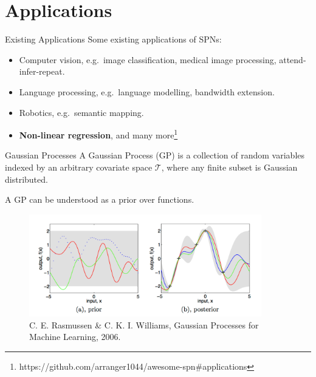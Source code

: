 \section{Applications}

\begin{frame}{Existing Applications}
Some existing applications of SPNs:
\begin{itemize}
    \item Computer vision, e.g.~image classification, medical image processing, attend-infer-repeat.
    \item Language processing, e.g.~language modelling, bandwidth extension.
    \item Robotics, e.g.~semantic mapping.
    \item \textbf{Non-linear regression}, and many more\footnote{\scriptsize https://github.com/arranger1044/awesome-spn\#applications}
\end{itemize}
\end{frame}

\begin{frame}{Gaussian Processes}
    A Gaussian Process (GP) is a collection of random variables indexed by an arbitrary
    covariate space $\mathcal{T}$, where any finite subset is Gaussian distributed.

    A GP can be understood as a prior over functions.

    \begin{figure}
        \includegraphics[width=0.9\textwidth]{GP_Rasmussen}
        \caption{\scriptsize C. E. Rasmussen \& C. K. I. Williams, Gaussian Processes for Machine Learning, 2006.}
    \end{figure}
\end{frame}


